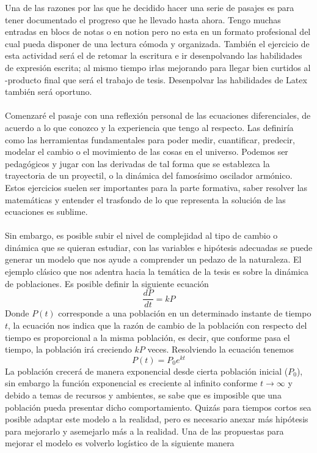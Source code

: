 \documentclass[11pt,a4paper]{article}
\begin{document}
Una de las razones por las que he decidido hacer una serie de pasajes es para tener documentado el progreso que he llevado hasta ahora. Tengo muchas entradas en blocs de notas o en notion pero no esta en un formato profesional del cual pueda disponer de una lectura cómoda y organizada. También el ejercicio de esta actividad será el de retomar la escritura e ir desenpolvando las habilidades de expresión escrita; al mismo tiempo irlas mejorando para llegar bien curtidos al -producto final que será el trabajo de tesis. Desenpolvar las habilidades de Latex también será oportuno.\\
\\
Comenzaré el pasaje con una reflexión personal de las ecuaciones diferenciales, de acuerdo a lo que conozco y la experiencia que tengo al respecto. Las definiría como las herramientas fundamentales para poder medir, cuantificar, predecir, modelar el cambio o el movimiento de las cosas en el universo. Podemos ser pedagógicos y jugar con las derivadas de tal forma que se establezca la trayectoria de un proyectil, o la dinámica del famosísimo oscilador armónico. Estos ejercicios suelen ser importantes para la parte formativa, saber resolver las matemáticas y entender el trasfondo de lo que representa la solución de las ecuaciones es sublime.\\
\\
Sin embargo, es posible subir el nivel de complejidad al tipo de cambio o dinámica que se quieran estudiar, con las variables e hipótesis adecuadas se puede generar un modelo que nos ayude a comprender un pedazo de la naturaleza. El ejemplo clásico que nos adentra hacia la temática de la tesis es sobre la dinámica de poblaciones. Es posible definir la siguiente ecuación
$$\frac{dP}{dt}=kP$$
Donde $P(t)$ corresponde a una población en un determinado instante de tiempo $t$, la ecuación nos indica que la razón de cambio de la población con respecto del tiempo es proporcional a la misma población, es decir, que conforme pasa el tiempo, la población irá creciendo $kP$ veces. Resolviendo la ecuación tenemos 
$$P(t)=P_0e^{kt}$$
La población crecerá de manera exponencial desde cierta población inicial ($P_0$), sin embargo la función exponencial es creciente al infinito conforme $t\to\infty$ y debido a temas de recursos y ambientes, se sabe que es imposible que una población pueda presentar dicho comportamiento. Quizás para tiempos cortos sea posible adaptar este modelo a la realidad, pero es necesario anexar más hipótesis para mejorarlo y asemejarlo más a la realidad. Una de las propuestas para mejorar el modelo es volverlo logístico de la siguiente manera
\end{document}
